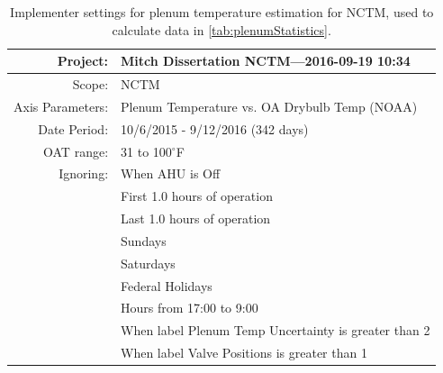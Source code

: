 \begin{table}[]
\centering
\caption{Implementer settings for plenum temperature estimation for NCTM, used to calculate data in \tableref{} \ref{tab:plenumStatistics}.}
\label{tab:PlenumTemperatureEstimation}
\begin{tabular}{@{}rl@{}}
\toprule
Project:         & Mitch Dissertation NCTM---2016-09-19 10:34           \\ \midrule
Scope:           & NCTM                                                 \\
Axis Parameters: & Plenum Temperature vs. OA Drybulb Temp (NOAA)        \\
Date Period:     & 10/6/2015 - 9/12/2016  (342 days)                    \\
OAT range:       & 31 to 100\(^\circ\)F      \\
Ignoring:        & When AHU is Off                                      \\
                 & First 1.0 hours of operation                         \\
                 & Last 1.0 hours of operation                          \\
                 & Sundays                                              \\
                 & Saturdays                                            \\
                 & Federal Holidays                                     \\
                 & Hours from 17:00 to 9:00                             \\
                 & When label Plenum Temp Uncertainty is greater than 2 \\
                 & When label Valve Positions is greater than 1         \\ \bottomrule
\end{tabular}
\end{table}



